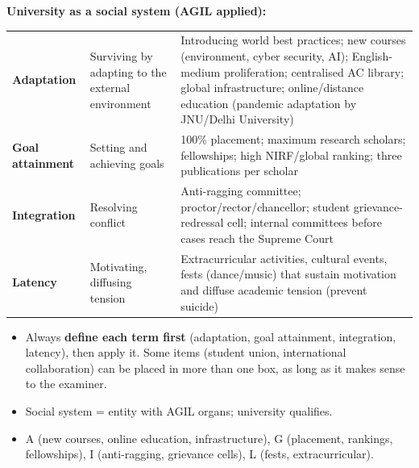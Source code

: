 \begin{ComparisonBox}
\textbf{University as a social system (AGIL applied):}\vspace{4pt}
\begin{center}
\begin{tabularx}{\textwidth}{p{2.8cm} p{3.8cm} Y}
 &  &  \\
\midrule
\textbf{Adaptation} & Surviving by adapting to the external environment & Introducing world best practices; new courses (environment, cyber security, AI); English-medium proliferation; centralised AC library; global infrastructure; online/distance education (pandemic adaptation by JNU/Delhi University) \\
\textbf{Goal attainment} & Setting and achieving goals & 100\% placement; maximum research scholars; fellowships; high NIRF/global ranking; three publications per scholar \\
\textbf{Integration} & Resolving conflict & Anti-ragging committee; proctor/rector/chancellor; student grievance-redressal cell; internal committees before cases reach the Supreme Court \\
\textbf{Latency} & Motivating, diffusing tension & Extracurricular activities, cultural events, fests (dance/music) that sustain motivation and diffuse academic tension (prevent suicide) \\
\bottomrule
\end{tabularx}
\end{center}
\end{ComparisonBox}

\begin{CriticalPoint}
\begin{itemize}
\item Always \textbf{define each term first} (adaptation, goal attainment, integration, latency), then apply it. Some items (student union, international collaboration) can be placed in more than one box, as long as it makes sense to the examiner.
\end{itemize}
\end{CriticalPoint}

\begin{QuickRevision}
\begin{itemize}
\item Social system = entity with AGIL organs; university qualifies.
\item A (new courses, online education, infrastructure), G (placement, rankings, fellowships), I (anti-ragging, grievance cells), L (fests, extracurricular).
\end{itemize}
\end{QuickRevision}

